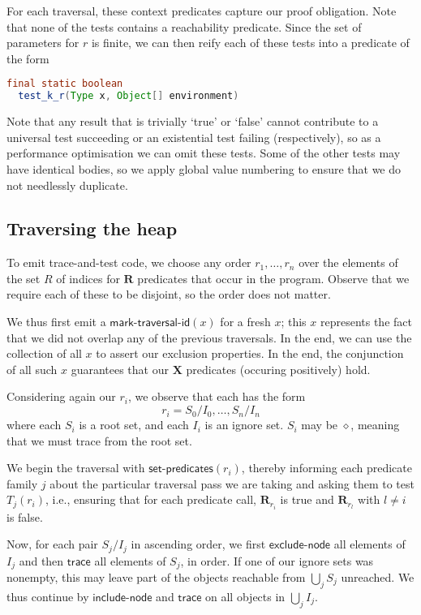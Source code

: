 \documentclass{report}
\newcommand{\reachOp}{\ensuremath{\mathbf{R}}}
\newcommand{\reach}[1]{\ensuremath{\reachOp_{#1}}}
\newcommand{\disjointOp}{\ensuremath{\mathbf{X}}}
\newcommand{\TTexclude}{\textsf{exclude-node}}
\newcommand{\TTinclude}{\textsf{include-node}}
\newcommand{\TTtid}{\textsf{mark-traversal-id}}
\newcommand{\TTset}{\textsf{set-predicates}}
\newcommand{\TTtrace}{\textsf{trace}}
\newcommand{\roots}{\ensuremath{\diamond}}
\begin{document}
For each traversal, these context predicates capture our proof
obligation.  Note that none of the tests contains a reachability
predicate.
  Since the set of parameters for $r$ is finite, we can then
reify each of these tests into a predicate of the form

\begin{lstlisting}[language=Java]
  final static boolean
  test_k_r(Type x, Object[] environment)
\end{lstlisting}

Note that any result that is trivially `\textsf{true}' or
`\textsf{false}' cannot contribute to a universal test succeeding or
an existential test failing (respectively), so as a performance
optimisation we can omit these tests.  Some of the other tests may
have identical bodies, so we apply global value numbering to ensure
that we do not needlessly duplicate.

\subsection{Traversing the heap}

To emit trace-and-test code, we choose any order $r_1, \ldots, r_n$
over the elements of the set $R$ of indices for $\reachOp$ predicates
that occur in the program.  Observe that we require each of these to
be disjoint, so the order does not matter.

We thus first emit a $\TTtid(x)$ for a fresh $x$; this $x$ represents
the fact that we did not overlap any of the previous traversals.  In
the end, we can use the collection of all $x$ to assert our exclusion
properties.  In the end, the conjunction of all such $x$ guarantees
that our $\disjointOp$ predicates (occuring positively) hold.

Considering again our $r_i$, we observe that each has the form
\[
r_i = S_0 / I_0, \ldots, S_n / I_n
\]
where each $S_i$ is a root set, and each $I_i$ is an ignore set.
$S_i$ may be $\roots$, meaning that we must trace from the root set.

We begin the traversal with $\TTset(r_i)$, thereby informing each
predicate family $j$ about the particular traversal pass we are taking and
asking them to test $T_j(r_i)$, i.e., ensuring that for each predicate
call, $\reach{r_i}$ is \textsf{true} and $\reach{r_l}$ with $l \ne i$
is \textsf{false}.

Now, for each pair $S_j / I_j$ in ascending order, we first
$\TTexclude$ all elements of $I_j$ and then $\TTtrace$
all elements of $S_j$, in order.  If one of our ignore sets was
nonempty, this may leave part of the objects reachable from $\bigcup_j
S_j$ unreached.  We thus continue by $\TTinclude$ and $\TTtrace$ on
all objects in $\bigcup_j I_j$.
\end{document}
